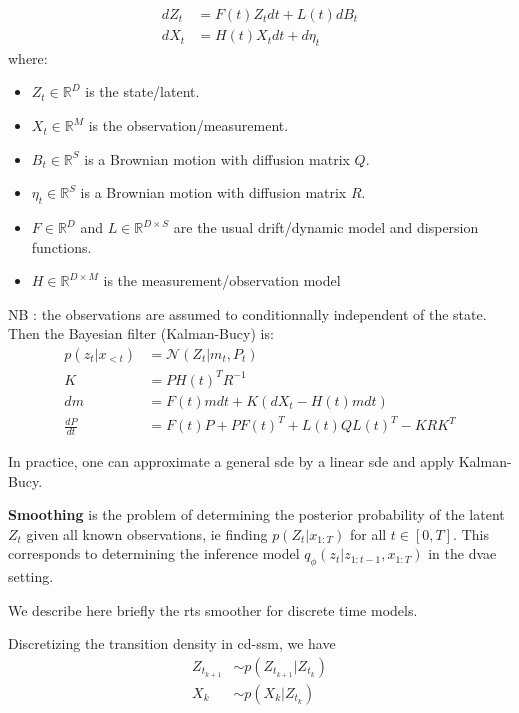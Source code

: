 \begin{tcolorbox}[colback=blue!5!white,colframe=black!75!black,title=Kalman-Bucy filter]
    \begin{align}
        dZ_t &= F(t)Z_t dt + L(t) dB_t \\
        dX_t &= H(t)X_t dt + d\eta_t
    \end{align}
    where:
    \begin{itemize}
        \item $Z_t \in \mathbb{R}^{D}$ is the state/latent.
        \item $X_t \in \mathbb{R}^{M}$ is the observation/measurement.
        \item $B_t \in \mathbb{R}^{S}$ is a Brownian motion with diffusion matrix $Q$.
        \item $\eta_t \in \mathbb{R}^{S}$ is a Brownian motion with diffusion matrix $R$.
        \item $F \in \mathbb{R}^{D}$ and $L \in \mathbb{R}^{D \times S}$ are the usual drift/dynamic model and dispersion functions.
        \item $H \in \mathbb{R}^{D \times M}$ is the measurement/observation model
    \end{itemize}
    NB : the observations are assumed to conditionnally independent of the state.
    Then the Bayesian filter (Kalman-Bucy) is:
    \begin{align}
        p(z_t \vert x_{<t}) &= \mathcal{N}(Z_t \vert m_t, P_t) \\
        K &= P H(t)^{T} R^{-1} \\
        dm &= F(t)m dt + K (dX_t - H(t) m dt) \\
        \frac{dP}{dt} &= F(t)P + P F(t)^{T} + L(t)QL(t)^{T} - KRK^{T}
    \end{align}
\end{tcolorbox}

In practice, one can approximate a general \gls{sde} by a linear \gls{sde} and apply Kalman-Bucy.

\textbf{Smoothing} is the problem of determining the posterior probability of the latent $Z_t$ given 
all known observations, ie finding $p(Z_t \vert x_{1:T})$ for all $t \in [0,T]$. This corresponds to 
determining the inference model $q_{\phi}(z_t \vert z_{1:t-1}, x_{1:T})$ in the \gls{dvae} setting.

We describe here briefly the \gls{rts} smoother for discrete time models.

Discretizing the transition density in \gls{cd-ssm}, we have
\begin{align}
    Z_{t_{k+1}} &\sim p(Z_{t_{k+1}} \vert Z_{t_k}) \\
    X_k &\sim p(X_k \vert Z_{t_k})
\end{align}

